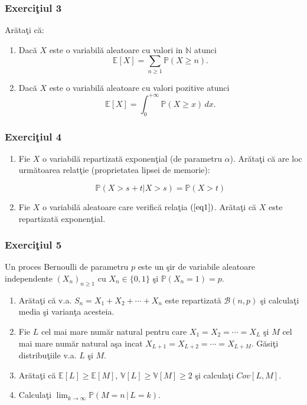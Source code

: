 \documentclass[]{article}
\providecommand{\tightlist}{%
  \setlength{\itemsep}{0pt}\setlength{\parskip}{0pt}}
\def\a{{\alpha}}
\def\PP{{\mathbb P}}
\def\EE{{\mathbb E}}
\def\VV{{\mathbb V}}
\def\NN{{\mathbb N}}
\def\MB{{\mathcal B}}
\begin{document}
\subsubsection{\texorpdfstring{Exerci\c tiul
3}{Exerciiul 3}}\label{exerciiul-3}

Ar\u ata\c ti c\u a:

\begin{enumerate}
\def\labelenumi{\alph{enumi})}
\item
  Dac\u a \(X\) este o variabil\u a aleatoare cu valori in \(\NN\)
  atunci \[
    \EE[X] = \displaystyle\sum_{n\geq 1}\PP(X\geq n).
  \]
\item
  Dac\u a \(X\) este o variabil\u a aleatoare cu valori pozitive atunci
  \[
    \EE[X] = \displaystyle\int_{0}^{+\infty}\PP(X\geq x)\, dx.
  \]
\end{enumerate}

\subsubsection{\texorpdfstring{Exerci\c tiul
4}{Exerciiul 4}}\label{exerciiul-4}

\begin{enumerate}
\def\labelenumi{\alph{enumi})}
\tightlist
\item
  Fie \(X\) o variabil\u a repartizat\u a exponen\c tial (de parametru
  \(\a\)). Ar\u ata\c ti c\u a are loc urm\u atoarea relat\c tie
  (proprietatea lipsei de memorie):

  \begin{equation}\label{eq1}
    \PP(X>s+t|X>s) = \PP(X>t) 
  \end{equation}
\item
  Fie \(X\) o variabil\u a aleatoare care verific\u a rela\c tia
  \((\ref{eq1})\). Ar\u ata\c ti c\u a \(X\) este repartizat\u a
  exponen\c tial.
\end{enumerate}

\subsubsection{\texorpdfstring{Exerci\c tiul
5}{Exerciiul 5}}\label{exerciiul-5}

Un proces Bernoulli de parametru \(p\) este un \c sir de variabile
aleatoare independente \((X_n)_{n\geq1}\) cu \(X_n\in\{0,1\}\) \c si
\(\PP(X_n=1)=p\).

\begin{enumerate}
\def\labelenumi{\alph{enumi})}
\item
  Ar\u ata\c ti c\u a v.a. \(S_n=X_1+X_2+\cdots+X_n\) este
  repartizat\u a \(\MB(n,p)\) \c si calcula\c ti media \c si varian\c ta
  acesteia.
\item
  Fie \(L\) cel mai mare num\u ar natural pentru care
  \(X_1=X_2=\cdots=X_L\) \c si \(M\) cel mai mare num\u ar natural
  a\c sa incat \(X_{L+1}=X_{L+2}=\cdots=X_{L+M}\). G\u asi\c ti
  distribu\c tiile v.a. \(L\) \c si \(M\).
\item
  Ar\u ata\c ti c\u a \(\EE[L]\geq\EE[M]\), \(\VV[L]\geq\VV[M]\geq2\)
  \c si calcula\c ti \(Cov[L,M]\).
\item
  Calcula\c ti \(\displaystyle\lim_{k\to\infty}\PP(M=n\,|\,L=k)\).
\end{enumerate}
\end{document}
